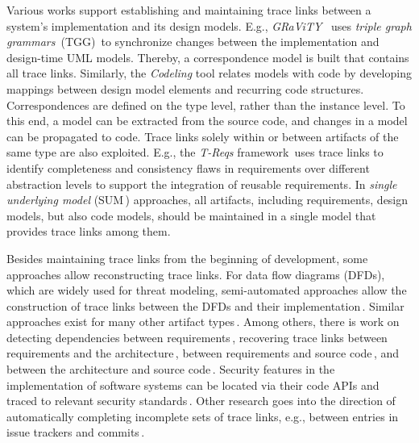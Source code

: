 Various works support establishing and maintaining trace links between a system's implementation and its design models.
E.g., %
\emph{GRaViTY}%
\,\cite{PKLS2015,PBKJ2021,Peldszus2022} %
uses
\emph{triple graph grammars}~(TGG)\,\cite{schurr1994specification} to synchronize changes between the implementation and design-time UML models.
Thereby, a correspondence model is built that contains all trace links.
Similarly, the \emph{Codeling} tool \cite{Konersmann2018OEM, Konersmann2018EIA} relates models with code by developing mappings between design model elements and recurring code structures.
Correspondences are defined on the type level, rather than the instance level.
To this end, a model can be extracted from the source code, and changes in a model can be propagated to code.
Trace links solely within or between artifacts of the same type are also exploited.
E.g., the \emph{T-Reqs} framework\,\cite{Grosser2022RDR} uses trace links
to identify completeness and consistency flaws in requirements over different abstraction levels to support the integration of reusable requirements.
In \emph{single underlying model} (SUM\,\cite{Meier2020,Atkinson2010}) approaches, all artifacts, including requirements, design models, but also code models, should be maintained in a single model that provides trace links among them.

Besides maintaining trace links from the beginning of development, some approaches allow reconstructing trace links. %
For data flow diagrams (DFDs), which are widely used for threat modeling, semi-automated approaches allow the construction of trace links between the DFDs and their implementation\,\cite{Peldszus2019SDF,TPS2022}.
Similar approaches exist for many other artifact types\,\cite{Rasiman2022,Merten2016}.
Among others, there is work on detecting dependencies between requirements\,\cite{Samer2019NAI,Wang2020DSS}, recovering trace links between requirements and the architecture\,\cite{Goknil2014,Keim2024},
between requirements and source code\,\cite{10.1145/2491627.2491633,Hey2024}, and between the architecture and source code\,\cite{keim2021trace}.
Security features in the implementation of software systems can be located via their code APIs and traced to relevant security standards\,\cite{Hermann2025}.
Other research goes into the direction of automatically completing incomplete sets of trace links, e.g., between entries in issue trackers and commits\,\cite{rath2018}.

